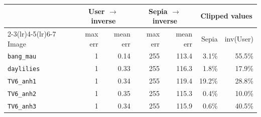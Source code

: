 \begin{tabular}{lrrrrrr}
\toprule
 & \multicolumn{2}{c}{User $\to$ inverse} & \multicolumn{2}{c}{Sepia $\to$ inverse} & \multicolumn{2}{c}{Clipped values} \\
\cmidrule(lr){2-3}\cmidrule(lr){4-5}\cmidrule(lr){6-7}
Image & max err & mean err & max err & mean err & Sepia & inv(User) \\
\midrule
\texttt{bang\_mau} & 1 & 0.14 & 255 & 113.4 & 3.1\% & 55.5\% \\
\texttt{daylilies} & 1 & 0.33 & 255 & 116.3 & 1.8\% & 17.9\% \\
\texttt{TV6\_anh1} & 1 & 0.34 & 255 & 119.4 & 19.2\% & 28.8\% \\
\texttt{TV6\_anh2} & 1 & 0.35 & 255 & 115.3 & 0.4\% & 10.0\% \\
\texttt{TV6\_anh3} & 1 & 0.34 & 255 & 115.9 & 0.6\% & 40.5\% \\
\bottomrule
\end{tabular}
